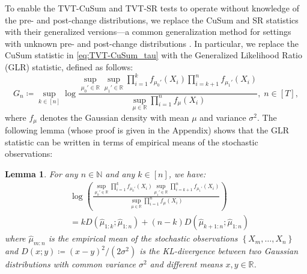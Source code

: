 \documentclass[12pt]{interact}
\newcommand{\lp}{\left(}
\newcommand{\rp}{\right)}
\newcommand{\lb}{\left[}
\newcommand{\rb}{\right]}
\newcommand{\lbp}{\left\{}
\newcommand{\rbp}{\right\}}
\newcommand{\mbb}{\mathbb}
\theoremstyle{plain}
\newtheorem{lemma}{Lemma}
\begin{document}
To enable the TVT-CuSum and TVT-SR tests to operate without knowledge of the pre- and post-change distributions, we replace the CuSum and SR statistics with their generalized versions---a common generalization method for settings with unknown pre- and post-change distributions \citep{lai1998information, lai2010sequential}. %
In particular, we replace the CuSum statistic in \eqref{eq:TVT-CuSum_tau} with the Generalized Likelihood Ratio (GLR) statistic, defined as follows:
%
%
\begin{equation} \label{eq:GLR_stat_pre-post-unknown}
    G_{n} \coloneqq \sup_{k \in \lb n \rb} \log  \frac{\sup_{\mu_{0}' \in \mbb{R}} \sup_{\mu_{1}' \in \mbb{R}} \prod_{i = 1}^{k} f_{\mu_{0}'}\lp X_{i} \rp \prod_{i = k + 1}^{n} f_{\mu_{1}'}\lp X_{i} \rp}{\sup_{\mu\in\mbb{R}} \prod_{i = 1}^{n} f_{\mu} \lp X_{i} \rp},\; n \in \lb T \rb,
\end{equation}
%
where $f_{\mu}$ denotes the Gaussian density with mean $\mu$ and variance $\sigma^{2}$. The following lemma (whose proof is given in the Appendix) shows that the GLR statistic can be written in terms of empirical means of the stochastic observations:

\begin{lemma}\label{lem:GLR-kl-unknown-pre-post}
For any $n\in\mbb{N}$ and any $k\in\lb n\rb$, we have:
%
\begin{align}
    &\log\lp\frac{\sup_{\mu_{0}'\in\mbb{R}}\prod_{i=1}^{k}f_{\mu_{0}'}\lp X_{i}\rp\sup_{\mu_{1}'\in\mbb{R}}\prod_{i=k+1}^{n}f_{\mu_{1}'}\lp X_{i}\rp}{\sup_{\mu\in\mbb{R}}\prod_{i=1}^{n}f_{\mu}\lp X_{i}\rp}\rp\nonumber\\
    &=k D \lp\hat{\mu}_{1:k};\hat{\mu}_{1:n}\rp+\lp n-k\rp D \lp\hat{\mu}_{k+1:n};\hat{\mu}_{1:n}\rp\label{eq:lr-kl}
\end{align}
where $\hat{\mu}_{m:n}$ is the empirical mean of the stochastic observations $\lbp X_{m}, \dots, X_{n} \rbp$ and \textup{$ D \lp x;y\rp\coloneqq(x-y)^{2}/(2\sigma^{2})$} is the KL-divergence between two Gaussian distributions with common variance $\sigma^{2}$ and different means $x,y\in\mbb{R}$.
\end{lemma}
\end{document}
